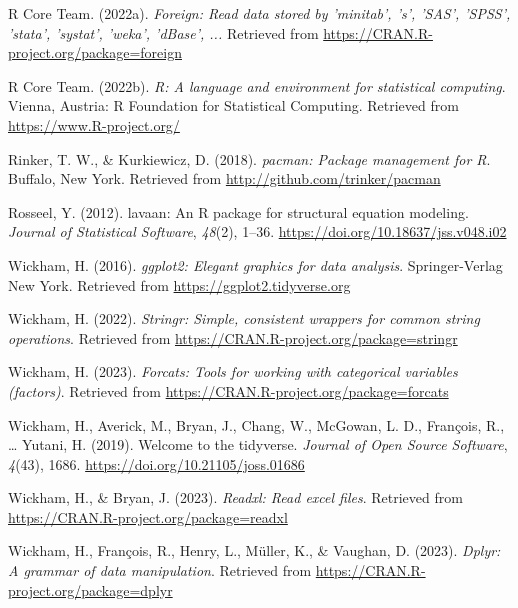\documentclass[
  man]{apa6}
\newlength{\cslhangindent}
\newlength{\cslentryspacingunit} %
\newenvironment{CSLReferences}[2] %
 {%
  \setlength{\parindent}{0pt}
  \ifodd #1
  \let\oldpar\par
  \def\par{\hangindent=\cslhangindent\oldpar}
  \fi
  \setlength{\parskip}{#2\cslentryspacingunit}
 }%
 {}
\begin{document}
\begin{CSLReferences}{1}{0}
\leavevmode{}%
R Core Team. (2022a). \emph{Foreign: Read data stored by 'minitab', 's', 'SAS', 'SPSS', 'stata', 'systat', 'weka', 'dBase', ...} Retrieved from \url{https://CRAN.R-project.org/package=foreign}

\leavevmode{}%
R Core Team. (2022b). \emph{R: A language and environment for statistical computing}. Vienna, Austria: R Foundation for Statistical Computing. Retrieved from \url{https://www.R-project.org/}

\leavevmode{}%
Rinker, T. W., \& Kurkiewicz, D. (2018). \emph{{pacman}: {P}ackage management for {R}}. Buffalo, New York. Retrieved from \url{http://github.com/trinker/pacman}

\leavevmode{}%
Rosseel, Y. (2012). {lavaan}: An {R} package for structural equation modeling. \emph{Journal of Statistical Software}, \emph{48}(2), 1--36. \url{https://doi.org/10.18637/jss.v048.i02}

\leavevmode{}%
Wickham, H. (2016). \emph{ggplot2: Elegant graphics for data analysis}. Springer-Verlag New York. Retrieved from \url{https://ggplot2.tidyverse.org}

\leavevmode{}%
Wickham, H. (2022). \emph{Stringr: Simple, consistent wrappers for common string operations}. Retrieved from \url{https://CRAN.R-project.org/package=stringr}

\leavevmode{}%
Wickham, H. (2023). \emph{Forcats: Tools for working with categorical variables (factors)}. Retrieved from \url{https://CRAN.R-project.org/package=forcats}

\leavevmode{}%
Wickham, H., Averick, M., Bryan, J., Chang, W., McGowan, L. D., François, R., \ldots{} Yutani, H. (2019). Welcome to the {tidyverse}. \emph{Journal of Open Source Software}, \emph{4}(43), 1686. \url{https://doi.org/10.21105/joss.01686}

\leavevmode{}%
Wickham, H., \& Bryan, J. (2023). \emph{Readxl: Read excel files}. Retrieved from \url{https://CRAN.R-project.org/package=readxl}

\leavevmode{}%
Wickham, H., François, R., Henry, L., Müller, K., \& Vaughan, D. (2023). \emph{Dplyr: A grammar of data manipulation}. Retrieved from \url{https://CRAN.R-project.org/package=dplyr}


\end{CSLReferences}
\end{document}
